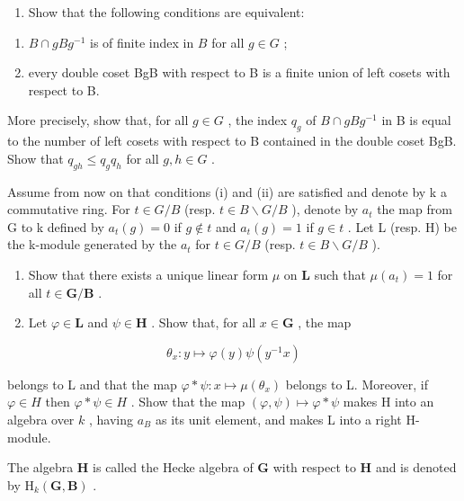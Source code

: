 \begin{enumerate}
\def\labelenumi{\alph{enumi})}
\tightlist
\item
  Show that the following conditions are equivalent:
\end{enumerate}

\begin{enumerate}
\def\labelenumi{(\roman{enumi})}
\item
  \(B \cap gBg^{-1}\) is of finite index in \(B\) for all \(g \in G\) ;
\item
  every double coset BgB with respect to B is a finite union of left cosets with respect to B.
\end{enumerate}

More precisely, show that, for all \(g \in G\) , the index \(q_{g}\) of \(B \cap gBg^{-1}\) in B is equal to the number of left cosets with respect to B contained in the double coset BgB. Show that \(q_{gh} \leqslant q_{g}q_{h}\) for all \(g, h \in G\) .

Assume from now on that conditions (i) and (ii) are satisfied and denote by k a commutative ring. For \(t \in G/B\) (resp. \(t \in B \backslash G/B\) ), denote by \(a_{t}\) the map from G to k defined by \(a_{t}(g) = 0\) if \(g \notin t\) and \(a_{t}(g) = 1\) if \(g \in t\) . Let L (resp. H) be the k-module generated by the \(a_{t}\) for \(t \in G/B\) (resp. \(t \in B \backslash G/B\) ).

\begin{enumerate}
\def\labelenumi{\alph{enumi})}
\setcounter{enumi}{1}
\item
  Show that there exists a unique linear form \(\mu\) on \(\mathbf{L}\) such that \(\mu(a_t) = 1\) for all \(t \in \mathbf{G} / \mathbf{B}\) .
\item
  Let \(\varphi \in \mathbf{L}\) and \(\psi \in \mathbf{H}\) . Show that, for all \(x \in \mathbf{G}\) , the map
\end{enumerate}

\[
\theta_ {x}: y \mapsto \varphi (y) \psi (y ^ {- 1} x)
\]

belongs to L and that the map \(\varphi * \psi : x \mapsto \mu(\theta_x)\) belongs to L. Moreover, if \(\varphi \in H\) then \(\varphi * \psi \in H\) . Show that the map \((\varphi, \psi) \mapsto \varphi * \psi\) makes H into an algebra over \(k\) , having \(a_B\) as its unit element, and makes L into a right H-module.

The algebra \(\mathbf{H}\) is called the Hecke algebra of \(\mathbf{G}\) with respect to \(\mathbf{H}\) and is denoted by \(\mathrm{H}_k(\mathbf{G},\mathbf{B})\) .

